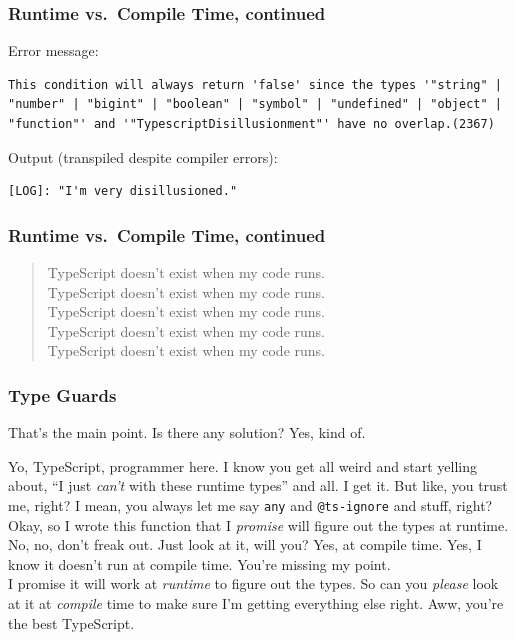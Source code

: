 \documentclass[aspectratio=169]{beamer}
\begin{document}
\begin{frame}[fragile]
  \frametitle{Runtime vs.\ Compile Time, continued}
  Error message: \\

  \small

  \begin{lstlisting}
This condition will always return 'false' since the types '"string" |
"number" | "bigint" | "boolean" | "symbol" | "undefined" | "object" |
"function"' and '"TypescriptDisillusionment"' have no overlap.(2367)
    \end{lstlisting}

  Output (transpiled despite compiler errors): \\

  \begin{lstlisting}
[LOG]: "I'm very disillusioned."
  \end{lstlisting}
\end{frame}

\begin{frame}
  \frametitle{Runtime vs.\ Compile Time, continued}
  \begin{quote}
    TypeScript doesn't exist when my code runs. \\
    TypeScript doesn't exist when my code runs. \\
    TypeScript doesn't exist when my code runs. \\
    TypeScript doesn't exist when my code runs. \\
    TypeScript doesn't exist when my code runs.
  \end{quote}
\end{frame}

\begin{frame}[fragile]
  \frametitle{Type Guards}
  \small

  That's the main point. Is there any solution? Yes, kind of. \\

  \begin{tcolorbox}
    Yo, TypeScript, programmer here. I know you get all weird and start
    yelling about, ``I just \emph{can't} with these runtime types'' and all.
    I get it. But like, you trust me, right? I mean, you always let me say
    \texttt{any} and \texttt{@ts-ignore} and stuff, right? \\

    Okay, so I wrote this function that I \emph{promise} will figure out the
    types at runtime. No, no, don't freak out. Just look at it, will you?
    Yes, at compile time. Yes, I know it doesn't run at compile time. You're
    missing my point. \\

    I promise it will work at \emph{runtime} to figure out the types. So can
    you \textit{please} look at it at \emph{compile} time to make sure I'm
    getting everything else right. Aww, you're the best TypeScript.
  \end{tcolorbox}
\end{frame}
\end{document}
